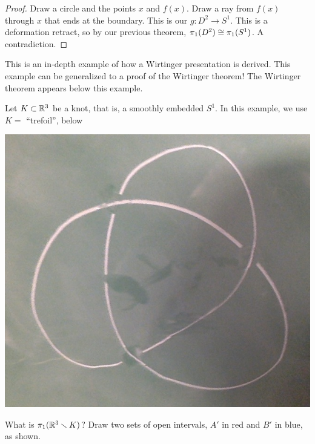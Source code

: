 \documentclass[11pt,leqno,oneside]{amsart}
\newenvironment{dateenv}{
  \vspace{1em}
}{
  \vspace{1em}
}
\newcommand{\mydate}[4]{
  \newdate{#1}{#2}{#3}{#4}
  \begin{dateenv}
    \hfill\displaydate{#1}
  \end{dateenv}
}
\numberwithin{thm}{section}
\newcommand{\minus}{\smallsetminus}
\newcommand{\fund}{\pi_1}
\begin{document}
\begin{proof}
  Draw a circle and the points $x$ and $f(x)$.  Draw a ray from $f(x)$ through $x$ that ends at the boundary.  This is our $g\colon D^2 \to S^1$.  This is a deformation retract, so by our previous theorem, $\fund(D^2) \isom \fund(S^1)$.  A contradiction.
\end{proof}





\mydate{d6}{3}{2}{2017}

\begin{example}
  This is an in-depth example of how a Wirtinger presentation is derived.  This example can be generalized to a proof of the Wirtinger theorem!  The Wirtinger theorem appears below this example.

  Let $K \subset {\mathbb R}^3$ be a knot, that is, a smoothly embedded $S^1$.  In this example, we use $K =$ ``trefoil'', below

  \includegraphics[scale=0.15]{images/trefoil.jpg}

  What is $\fund(\R^3\minus K)$?  Draw two sets of open intervals, $A'$ in red and $B'$ in blue, as shown.


\end{example}
\end{document}
